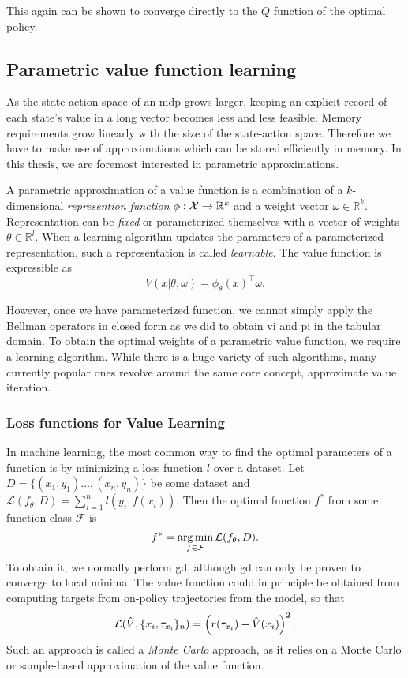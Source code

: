 This again can be shown to converge directly to the $Q$ function of the optimal policy.

\subsection{Parametric value function learning}

As the state-action space of an \ac{mdp} grows larger, keeping an explicit record of each state's value in a long vector becomes less and less feasible.
Memory requirements grow linearly with the size of the state-action space.
Therefore we have to make use of approximations which can be stored efficiently in memory.
In this thesis, we are foremost interested in parametric approximations.

\begin{definition}
    A parametric approximation of a value function is a combination of a $k$-dimensional \emph{represention function} $\phi: \mathcal{X} \rightarrow \mathbb{R}^k$ and a weight vector $\omega \in \mathbb{R}^k$.
    Representation can be \emph{fixed} or parameterized themselves with a vector of weights $\theta \in \mathbb{R}^l$.
    When a learning algorithm updates the parameters of a parameterized representation, such a representation is called \emph{learnable}.
    The value function is expressible as
    $$V(x|\theta,\omega) = \phi_\theta(x)^\top \omega.$$
\end{definition}

However, once we have parameterized function, we cannot simply apply the Bellman operators in closed form as we did to obtain \ac{vi} and \ac{pi} in the tabular domain.
To obtain the optimal weights of a parametric value function, we require a learning algorithm.
While there is a huge variety of such algorithms, many currently popular ones revolve around the same core concept, approximate value iteration.

\subsubsection{Loss functions for Value Learning}

In machine learning, the most common way to find the optimal parameters of a function is by minimizing a loss function $l$ over a dataset.
Let $D = \{(x_1, y_1) \dots, (x_n, y_n)\}$ be some dataset and $\mathcal{L}(f_\theta,D) = \sum_{i=1}^n l(y_i, f(x_i))$.
Then the optimal function $f^*$ from some function class $\mathcal{F}$ is $$f^* = \operatorname*{arg\,min}_{f \in \mathcal{F}} \mathcal{L}(f_\theta,D).$$
To obtain it, we normally perform \ac{gd}, although \ac{gd} can only be proven to converge to local minima.
The value function could in principle be obtained from computing targets from on-policy trajectories from the model, so that $$\mathcal{L}(\hat{V}, \{x_i, \tau_{x_i}\}_n) = \left(r(\tau_{x_i}) - \hat{V}(x_i)\right)^2.$$
Such an approach is called a \emph{Monte Carlo} approach, as it relies on a Monte Carlo or sample-based approximation of the value function.

